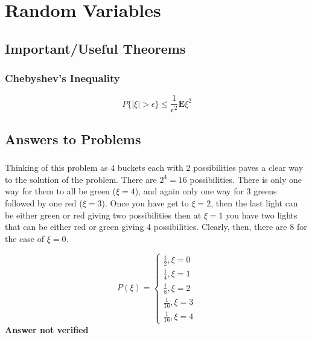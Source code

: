 
\chapter{Random Variables}

\section{Important/Useful Theorems}

\subsection{Chebyshev's Inequality}

\begin{equation}
	P \{ |\xi| > \epsilon \} \leq \frac{1}{\epsilon^2} \textbf{E}\xi^2
\end{equation}


\section{Answers to Problems}

\subsection{}
Thinking of this problem as 4 buckets each with 2 possibilities paves a clear way to the solution of the problem.  There are $2^4 = 16$ possibilities.  There is only one way for them to all be green ($\xi = 4$), and again only one way for 3 greens followed by one red ($\xi = 3$).  Once you have get to $\xi = 2$, then the last light can be either green or red giving two possibilities then at $\xi = 1$ you have two lights that can be either red or green giving 4 possibilities.  Clearly, then, there are 8 for the case of $\xi = 0$.  

\begin{equation}
	P(\xi) = \left\{ \begin{array}{rl}
	\frac{1}{2}, \xi=0  \\
	\frac{1}{4}, \xi=1  \\
	\frac{1}{8}, \xi=2  \\
	\frac{1}{16}, \xi=3  \\
	\frac{1}{16}, \xi=4
       \end{array} \right.
\label{answer4.1}
\end{equation}
\textbf{Answer not verified}

